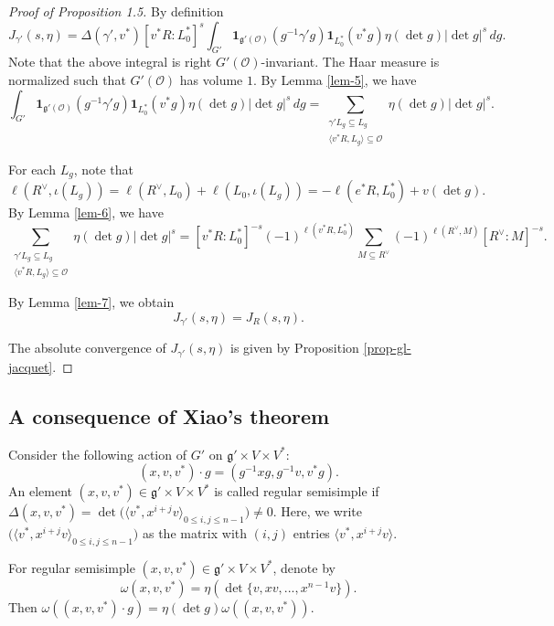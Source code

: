 \documentclass[a4paper]{amsart}
\newcommand{\CO}{{\mathcal {O}}} \newcommand{\CP}{{\mathcal {P}}}
\newcommand{\fg}{{\mathfrak{g}}} \newcommand{\fh}{{\mathfrak{h}}}
\theoremstyle{plain}
\theoremstyle{remark} \newtheorem{remark}[thm]{Remark}
\theoremstyle{exercise} \newtheorem{exercise}[thm]{Exercise}
\theoremstyle{example} \newtheorem{example}[thm]{Example}
\theoremstyle{question} \newtheorem{question}[thm]{Question}
\theoremstyle{assumption} \newtheorem{assumption}[thm]{Assumption}
\numberwithin{equation}{section}
\begin{document}
\begin{proof}[Proof of Proposition 1.5]

By definition
\[J_{\gamma'}(s,\eta) =
\Delta(\gamma',v^*)[v^*R:L_0^*]^s
\int_{G'}
\mathbf 1_{\fg'(\CO )}(g^{-1}\gamma'g)
\mathbf 1_{L_0^*}(v^*g)
\eta(\det g)|\det g|^s\,dg.\]
Note that the above integral is right $G'(\CO)$-invariant.
The Haar measure is normalized such that $G'(\CO)$ has volume $1$.
By  Lemma \ref{lem-5}, we have
\[\int_{G'}
\mathbf 1_{\fg'(\CO )}(g^{-1}\gamma'g)
\mathbf 1_{L_0^*}(v^*g)
\eta(\det g)|\det g|^s\,dg
= \sum_{\substack{\gamma' L_g\subseteq L_g \\\langle v^*R,L_g\rangle \subseteq\mathcal O}}\eta(\det g)|\det g|^s.\]

For each $L_g$, note that
\[\ell(R^\vee,\iota(L_g))=\ell(R^\vee,L_0)+\ell(L_0,\iota(L_g))=-\ell(e^*R,L_0^*)+v(\det g).\]
By Lemma \ref{lem-6}, we have
\[\sum_{\substack{\gamma' L_g\subseteq L_g \\\langle v^*R,L_g\rangle \subseteq\mathcal O}}\eta(\det g)|\det g|^s
= [v^*R:L_0^*]^{-s}(-1)^{\ell(v^*R,L_0^*)}\sum_{M\subseteq R^\vee}(-1)^{\ell(R^\vee,M)}[R^\vee:M]^{-s}.\]

By Lemma \ref{lem-7}, we obtain
\[J_{\gamma'}(s,\eta) = J_R(s,\eta).\]

The absolute convergence of $J_{\gamma'}(s,\eta)$ is given by Proposition \ref{prop-gl-jacquet}.

\end{proof}



\subsection{A consequence of Xiao's theorem}





Consider the following action of $G'$ on $\fg'\times V\times V^*$:
\[(x,v,v^*)\cdot g=(g^{-1}xg,g^{-1}v,v^* g).\]
An element $(x,v,v^*)\in \fg'\times V\times V^*$ is called regular semisimple if $\Delta(x,v,v^*)=\det\big(\langle v^*,x^{i+j}v\rangle_{0\leq i,j\leq n-1}\big)\neq0$. 
Here, we write $\big(\langle v^*,x^{i+j}v\rangle_{0\leq i,j\leq n-1}\big)$ as the matrix with $(i,j)$ entries $\langle v^*,x^{i+j}v\rangle$. 

For regular semisimple $(x,v,v^*) \in \fg' \times V \times V^*$, denote by \[\omega(x,v,v^*)=\eta(\det \{v,xv,...,x^{n-1}v\}).\]
Then $\omega((x,v,v^*) \cdot g) = \eta(\det g)\omega( (x,v,v^*))$.
\end{document}
